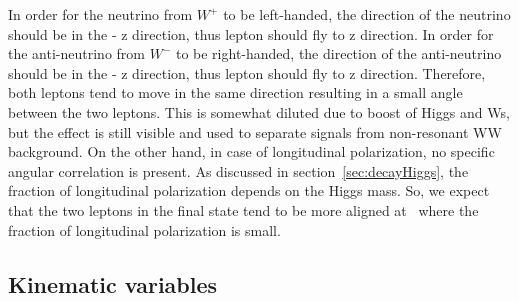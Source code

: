 In order for the neutrino from $W^+$ to be left-handed, the direction 
of the neutrino should be in the - z direction, thus lepton should 
fly to z direction. In order for the anti-neutrino from $W^-$ to be 
right-handed, the direction of the anti-neutrino should be in the 
- z direction, thus lepton should fly to z direction.
Therefore, both leptons tend to move in the same direction 
resulting in a small angle between the two leptons. 
This is somewhat diluted due to boost of Higgs and Ws, 
but the effect is still visible and used to separate signals 
from non-resonant WW background. 
On the other hand, in case of longitudinal polarization, 
no specific angular correlation is present. 
As discussed in section~\ref{sec:decayHiggs}, the fraction of longitudinal 
polarization depends on the Higgs mass. So, we expect that the two leptons 
in the final state tend to be more aligned at \mHi\ where the fraction of longitudinal 
polarization is small. 


%
\subsection{Kinematic variables}
\label{subsec:kinimetic_variables}

